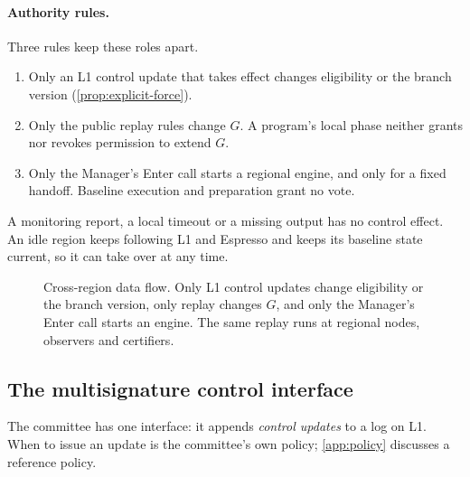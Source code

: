 \documentclass[11pt,a4paper]{article}
\begin{document}
\paragraph{Authority rules.}
Three rules keep these roles apart.
\begin{enumerate}[label=(A\arabic*)]
\item Only an L1 control update that takes effect changes eligibility or
the branch version (\cref{prop:explicit-force}).
\item Only the public replay rules change $G$. A program's local phase
neither grants nor revokes permission to extend $G$.
\item Only the Manager's Enter call starts a regional engine, and only
for a fixed handoff. Baseline execution and preparation grant no vote.
\end{enumerate}
A monitoring report, a local timeout or a missing output has no control
effect. An idle region keeps following L1 and Espresso and keeps its
baseline state current, so it can take over at any time.

\begin{figure}[p]\centering

\caption{Cross-region data flow. Only L1 control updates change
eligibility or the branch version, only replay changes $G$, and only the
Manager's Enter call starts an engine. The same replay runs at regional
nodes, observers and certifiers.}
\label{fig:runtime-modules}
\end{figure}
\FloatBarrier

\subsection{The multisignature control interface}
\label{sec:runtime-controls}
The committee has one interface: it appends \emph{control updates} to a
log on L1.  When to issue an update is the
committee's own policy; \cref{app:policy} discusses a reference policy.
\end{document}
